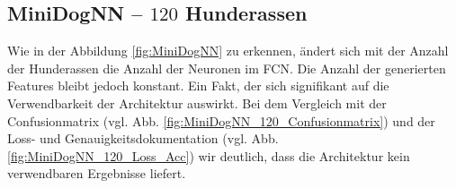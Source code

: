 %
\subsection{MiniDogNN -- $120$ Hunderassen}
Wie in der Abbildung \ref{fig:MiniDogNN} zu erkennen, ändert sich mit der
Anzahl der Hunderassen die Anzahl der Neuronen im FCN. Die Anzahl der generierten
Features bleibt jedoch konstant. Ein Fakt, der sich signifikant auf die
Verwendbarkeit der Architektur auswirkt. Bei dem Vergleich mit der Confusionmatrix
(vgl. Abb. \ref{fig:MiniDogNN_120_Confusionmatrix}) und
der Loss- und Genauigkeitsdokumentation (vgl. Abb. \ref{fig:MiniDogNN_120_Loss_Acc})
wir deutlich, dass die Architektur kein verwendbaren Ergebnisse liefert.

